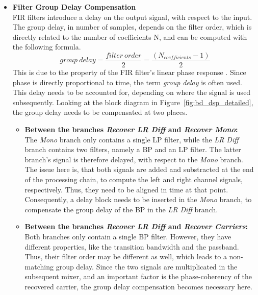 \begin{itemize}
  \item \textbf{Filter Group Delay Compensation}\\
      FIR filters introduce a delay on the output signal, with respect to the input.
      The group delay, in number of samples, depends on the filter order, which is directly related to the number of coefficients N, and can be computed with the following formula.
      \begin{equation}
        group\ delay = \frac{filter\ order}{2} = \frac{(N_{coefficients} - 1)}{2}
      \end{equation}
      This is due to the property of the FIR filter's linear phase response \cite{GaziOrhan2018UDSP}.
      Since phase is directly proportional to time, the term \textit{group delay} is often used.
      This delay needs to be accounted for, depending on where the signal is used subsequently.
      Looking at the block diagram in Figure~\ref{fig:bd_dsp_detailed}, the group delay needs to be compensated at two places.

      \begin{itemize}
        \item \textbf{Between the branches \textit{Recover LR Diff} and \textit{Recover Mono}:}\\
          The \textit{Mono} branch only contains a single LP filter, while the \textit{LR Diff} branch contains two filters, namely a BP and an LP filter.
          The latter branch's signal is therefore delayed, with respect to the \textit{Mono} branch.\\
          The issue here is, that both signals are added and substracted at the end of the processing chain, to compute the left and right channel signals, respectively.
          Thus, they need to be aligned in time at that point.
          Consequently, a delay block needs to be inserted in the \textit{Mono} branch, to compensate the group delay of the BP in the \textit{LR Diff} branch.

        \item \textbf{Between the branches \textit{Recover LR Diff} and \textit{Recover Carriers}:}\\
          Both branches only contain a single BP filter.
          However, they have different properties, like the transition bandwidth and the passband.
          Thus, their filter order may be different as well, which leads to a non-matching group delay.
          Since the two signals are multiplicated in the subsequent mixer, and an important factor is the phase-coherency of the recovered carrier, the group delay compensation becomes necessary here.\\
      \end{itemize}


\end{itemize}
